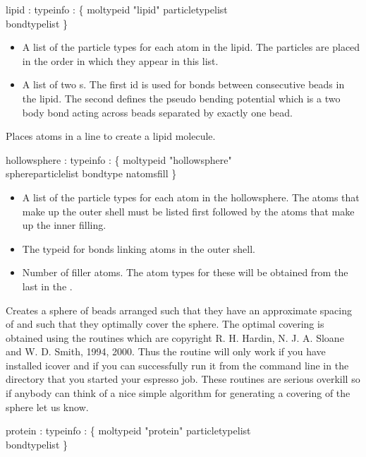 \begin{code}
  lipid  : typeinfo :  \{ moltypeid "lipid" particletypelist \\
           bondtypelist \}
\end{code}
\begin{itemize}
\item {} A list of the particle types for each atom in the lipid. The particles are placed in the order in which they appear in this list.
\item {} A list of two s. The first id is used for bonds between consecutive beads in the lipid. The second  defines the pseudo bending potential which is a two body bond acting across beads separated by exactly one bead.
\end{itemize}
Places atoms in a line to create a lipid molecule.
\begin{code}
  hollowsphere : typeinfo : \{ moltypeid "hollowsphere" \\
                 sphereparticlelist bondtype natomsfill \}
\end{code}
\begin{itemize}
\item {} A list of the particle types for each atom in the hollowsphere. The atoms that make up the outer shell must be listed first followed by the atoms that make up the inner filling.
\item {} The typeid for bonds linking atoms in the outer shell.
\item {} Number of filler atoms. The atom types for these will be obtained from the last  in the .
\end{itemize}
Creates a sphere of beads arranged such that they have an approximate spacing of  and such that they optimally cover the sphere. The optimal covering is obtained using the  routines which are copyright R. H. Hardin, N. J. A. Sloane and W. D. Smith, 1994, 2000. Thus the routine will only work if you have installed icover and if you can successfully run it from the command line in the directory that you started your espresso job. These routines are serious overkill so if anybody can think of a nice simple algorithm for generating a covering of the sphere let us know.
\begin{code}
  protein : typeinfo : \{ moltypeid "protein" particletypelist\\
            bondtypelist \}
\end{code}
